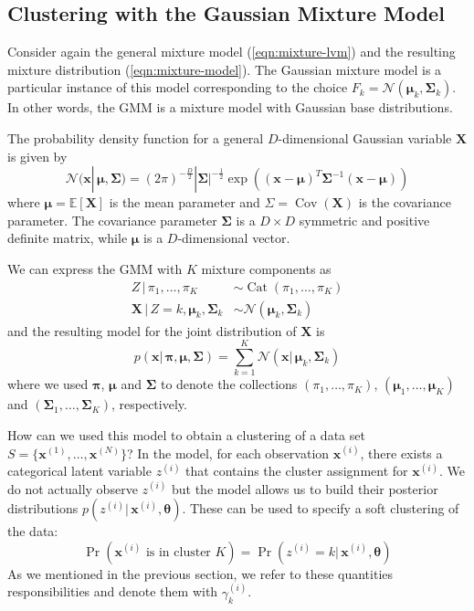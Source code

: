 \documentclass[final,3p,times,twocolumn]{elsarticle}
\DeclareMathOperator*{\Cov}{Cov}
\DeclareMathOperator*{\Cat}{Cat}
\let\bs\boldsymbol
\begin{document}
\subsection{Clustering with the Gaussian Mixture Model}
Consider again the general mixture model (\ref{eqn:mixture-lvm}) and the resulting mixture distribution (\ref{eqn:mixture-model}).
The Gaussian mixture model is a particular instance of this model corresponding to the choice $F_k = \mathcal{N}(\bs\mu_k,\bs\Sigma_k)$.
In other words, the GMM is a mixture model with Gaussian base distributions.

The probability density function for a general $D$-dimensional Gaussian variable $\bs X$ is given by
\begin{equation}
\label{eqn:gauss-pdf}
\mathcal{N}(\bs x|\,\bs\mu,\bs\Sigma) = (2\pi)^{-\frac{D}{2}}|\bs\Sigma|^{-\frac{1}{2}}\exp\left((\bs x - \bs\mu)^T\bs\Sigma^{-1}(\bs x-\bs\mu)\right)
\end{equation}
where $\bs\mu = \mathbb{E}[\bs X]$ is the mean parameter and $\Sigma = \Cov(\bs X)$ is the covariance parameter.
The covariance parameter $\bs\Sigma$ is a $D\times D$ symmetric and positive definite matrix, while $\bs\mu$ is a $D$-dimensional vector.

We can express the GMM with $K$ mixture components as
\begin{equation}
\label{eqn:gmm-lvm}
\begin{split}
Z\,|\,\pi_1,\dots,\pi_K &\sim \Cat(\pi_1,\dots,\pi_K)\\
\bs X \,|\,Z=k,\bs\mu_k,\bs\Sigma_k &\sim \mathcal{N}(\bs\mu_k,\bs\Sigma_k)
\end{split}
\end{equation}
and the resulting model for the joint distribution of $\bs X$ is 
\begin{equation}
\label{eqn:gmm-density}
p(\bs x|\,\bs\pi,\bs\mu,\bs\Sigma) = \sum_{k=1}^K \mathcal{N}(\bs x|\,\bs\mu_k,\bs\Sigma_k)
\end{equation}
where we used $\bs\pi$, $\bs\mu$ and $\bs\Sigma$ to denote the collections $(\pi_1,\dots,\pi_K)$, $(\bs\mu_1,\dots,\bs\mu_K)$ and $(\bs\Sigma_1,\dots,\bs\Sigma_K)$, respectively.

How can we used this model to obtain a clustering of a data set $S = \{\bs x^{(1)},\dots,\bs x^{(N)}\}$?
In the model, for each observation $\bs x^{(i)}$, there exists a categorical latent variable $z^{(i)}$ that contains the cluster assignment for $\bs x^{(i)}$.
We do not actually observe $z^{(i)}$ but the model allows us to build their posterior distributions $p(z^{(i)}|\,\bs x^{(i)},\bs \theta)$.
These can be used to specify a soft clustering of the data:
\begin{equation}
\Pr(\mbox{$\bs x^{(i)}$ is in cluster $K$}) = \Pr(z^{(i)} = k|\,\bs x^{(i)},\bs\theta)
\end{equation}
As we mentioned in the previous section, we refer to these quantities responsibilities and denote them with $\gamma_k^{(i)}$.
\end{document}
